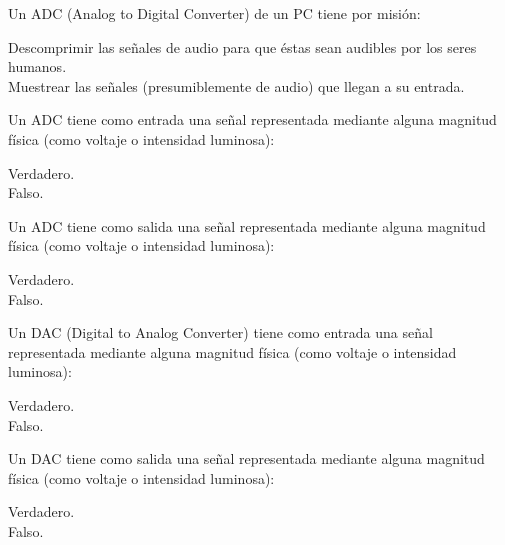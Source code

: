 \documentclass[legalpaper, 12pt, addpoints]{exam}
\begin{document}
\begin{questions}
\vspace{0.10in}

\question Un ADC (Analog to Digital Converter) de un PC tiene por misión:

\begin{oneparchoices}
  \choice Descomprimir las señales de audio para que éstas sean audibles por los seres humanos.\\
  \choice Muestrear las señales (presumiblemente de audio) que llegan a su entrada.
\end{oneparchoices}
  
\vspace{0.10in}

\question Un ADC tiene como entrada una señal representada mediante
alguna magnitud física (como voltaje o intensidad luminosa):

\begin{oneparchoices}
  \choice Verdadero.\\
  \choice Falso.
\end{oneparchoices}
  
\vspace{0.10in}

\question Un ADC tiene como salida una señal representada mediante
alguna magnitud física (como voltaje o intensidad luminosa):

\begin{oneparchoices}
  \choice Verdadero.\\
  \choice Falso.
\end{oneparchoices}

\question Un DAC (Digital to Analog Converter) tiene como entrada una
señal representada mediante alguna magnitud física (como voltaje o
intensidad luminosa):

\begin{oneparchoices}
  \choice Verdadero.\\
  \choice Falso.
\end{oneparchoices}
  
\vspace{0.10in}

\question Un DAC tiene como salida una señal representada mediante
alguna magnitud física (como voltaje o intensidad luminosa):

\begin{oneparchoices}
  \choice Verdadero.\\
  \choice Falso.
\end{oneparchoices}
  
\vspace{0.10in}


\end{questions}
\end{document}
